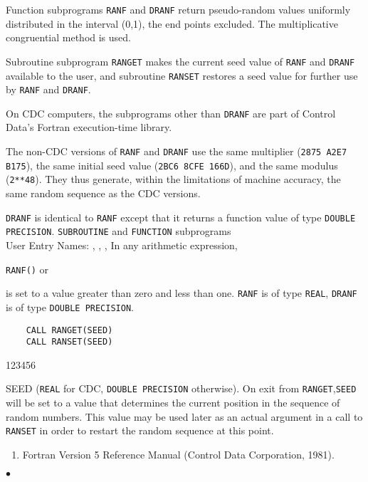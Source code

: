                       
             
 
       
\begin{center}
\end{center}
Function subprograms {\tt RANF} and {\tt DRANF} return pseudo-random
values uniformly distributed in the interval (0,1), the end points
excluded. The multiplicative congruential method is used.
\par
Subroutine subprogram {\tt RANGET} makes the current seed value of
{\tt RANF} and {\tt DRANF} available to the user, and subroutine
{\tt RANSET} restores a seed  value for further use by {\tt RANF} and
{\tt DRANF}.
\par
On CDC computers, the subprograms other than {\tt DRANF}
are part of Control Data's Fortran execution-time library.
 
The non-CDC versions of {\tt RANF} and {\tt DRANF} use the same
multiplier ({\tt 2875 A2E7 B175}), the same initial seed value
({\tt 2BC6 8CFE 166D}), and the same modulus ({\tt 2**48}).
They thus generate,
within the limitations of machine accuracy, the same random
sequence as the CDC versions.
\par
{\tt DRANF} is identical to {\tt RANF} except that it returns a function
value of type {\tt DOUBLE PRECISION}.
\Structure
{\tt SUBROUTINE} and {\tt FUNCTION} subprograms \\
User Entry Names: , , ,
\Usage
In any arithmetic expression,
\begin{center}
{\tt RANF()} \qquad or 
\end{center}
is set to a value greater than zero and less than one. {\tt RANF}
is of type {\tt REAL}, {\tt DRANF} is of type {\tt DOUBLE PRECISION}.
\begin{verbatim}
    CALL RANGET(SEED)
    CALL RANSET(SEED)
\end{verbatim}
\begin{DLtt}{123456}
\item[SEED] ({\tt REAL} for CDC, {\tt DOUBLE PRECISION} otherwise).
On exit from {\tt RANGET},{\tt SEED} will be set to a value that
determines the current position in the sequence of random numbers.
This value may be used later as an actual argument in a call to
{\tt RANSET} in order to restart the random sequence at this point.
\end{DLtt}
\Refer
\begin{enumerate}
\item Fortran Version 5 Reference Manual (Control Data
Corporation, 1981).
\end{enumerate}
$\bullet$
